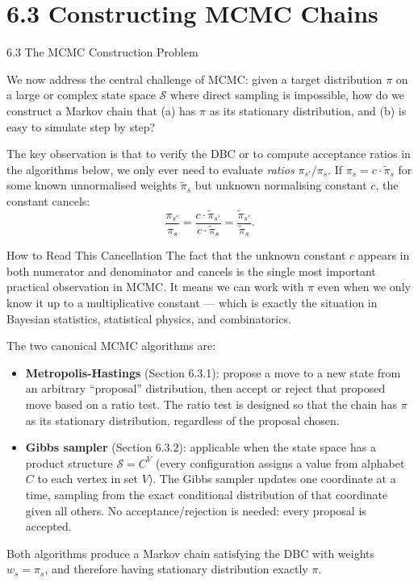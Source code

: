\documentclass[aspectratio=169,10pt]{beamer}
\begin{document}
\section{6.3 Constructing MCMC Chains}

\begin{frame}[allowframebreaks]{6.3 The MCMC Construction Problem}

We now address the central challenge of MCMC: given a target distribution $\pi$ on a large or complex state space $\mathcal{S}$ where direct sampling is impossible, how do we construct a Markov chain that (a) has $\pi$ as its stationary distribution, and (b) is easy to simulate step by step?

The key observation is that to verify the DBC or to compute acceptance ratios in the algorithms below, we only ever need to evaluate \emph{ratios} $\pi_{s'}/\pi_s$.
If $\pi_s = c \cdot \tilde{\pi}_s$ for some known unnormalised weights $\tilde{\pi}_s$ but unknown normalising constant $c$, the constant cancels:
\[
  \frac{\pi_{s'}}{\pi_s} = \frac{c \cdot \tilde{\pi}_{s'}}{c \cdot \tilde{\pi}_s} = \frac{\tilde{\pi}_{s'}}{\tilde{\pi}_s}.
\]

\begin{alertblock}{How to Read This Cancellation}
The fact that the unknown constant $c$ appears in both numerator and denominator and cancels is the single most important practical observation in MCMC.
It means we can work with $\pi$ even when we only know it up to a multiplicative constant --- which is exactly the situation in Bayesian statistics, statistical physics, and combinatorics.
\end{alertblock}

\framebreak

The two canonical MCMC algorithms are:
\begin{itemize}
  \item \textbf{Metropolis-Hastings} (Section 6.3.1): propose a move to a new state from an arbitrary ``proposal'' distribution, then accept or reject that proposed move based on a ratio test.
  The ratio test is designed so that the chain has $\pi$ as its stationary distribution, regardless of the proposal chosen.

  \item \textbf{Gibbs sampler} (Section 6.3.2): applicable when the state space has a product structure $\mathcal{S} = C^V$ (every configuration assigns a value from alphabet $C$ to each vertex in set $V$).
  The Gibbs sampler updates one coordinate at a time, sampling from the exact conditional distribution of that coordinate given all others.
  No acceptance/rejection is needed: every proposal is accepted.
\end{itemize}

Both algorithms produce a Markov chain satisfying the DBC with weights $w_s = \pi_s$, and therefore having stationary distribution exactly $\pi$.

\end{frame}
\end{document}
